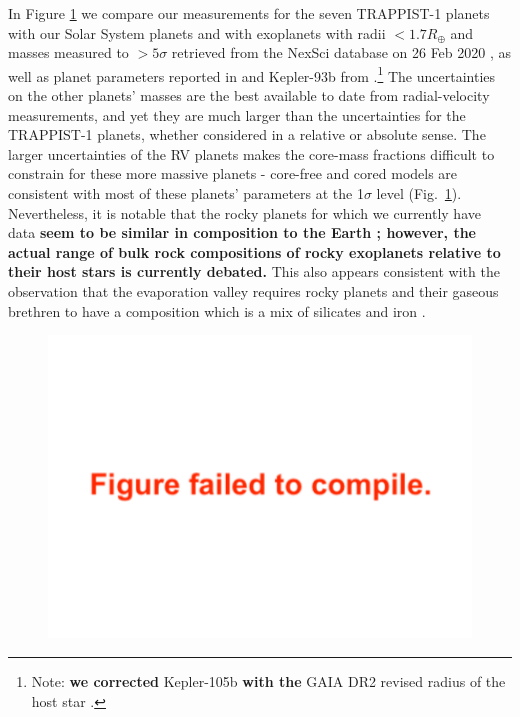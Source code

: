 \documentclass[twocolumn]{aastex63}
\begin{document}
In Figure \ref{fig:mass_radius_comparison} we compare our measurements for
the seven TRAPPIST-1 planets with our Solar System planets and with exoplanets
with radii ${<}1.7 R_\oplus$ and masses measured to ${>}5\sigma$ retrieved from
the NexSci database on 26 Feb 2020 \citep{Akeson2013,Christiansen2018}, as well
as planet parameters reported in \citet{Dai2019} and Kepler-93b from \citet{Dressing2015}.\footnote{Note: \textbf{we corrected} Kepler-105b \textbf{with the} GAIA DR2 revised radius of
    the host star \citep{Berger2018,Fulton2018}.}   The uncertainties
on the other planets' masses are the best available to date from radial-velocity measurements, and yet they are much larger than the uncertainties for the TRAPPIST-1 planets, whether considered in
a relative or absolute sense.  The larger uncertainties of the RV planets makes the core-mass fractions difficult to constrain
for these more massive planets - core-free and cored models are consistent with most of these planets' parameters at the 1$\sigma$ level (Fig.\ \ref{fig:mass_radius_comparison}).   Nevertheless, it is notable that the
rocky planets for which we currently have data \textbf{seem to be similar in composition to the
Earth \citep{Dressing2015}; however, the actual range of bulk rock compositions of rocky exoplanets relative to their host stars is currently debated.}
This also appears consistent with the observation
that the evaporation valley requires rocky planets and their gaseous brethren to have
a composition which is a mix of silicates and iron \citep{Owen2017}.

\begin{figure}
    \centering
    \includegraphics[width =0.8\hsize]{figures/mass_radius_relation_comparison.pdf}
    \label{fig:mass_radius_comparison}
\end{figure}
\end{document}
